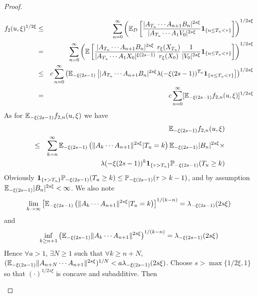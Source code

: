 \documentclass{article}
\begin{document}
\begin{proof}
\begin{enumerate}[(i)]
\begin{itemize}
\begin{eqnarray*}
        f_2(u, \xi)^{1/2\xi} &\leq& \sum_{n=0}^\infty \left(\mathbb{E}_D \left[
            \frac{
              |A_{T_u} \cdots A_{n+1} B_n |^{2s\xi}
            }{
              |A_{T_u} \cdots A_1 V_0|^{2s\xi}
            } \mathbf{1}_{\{n \leq T_u < \tau\}}
          \right]\right)^{1/2s\xi} \\
        &=& \sum_{n=0}^\infty \left(\mathbb{E} \left[
            \frac{
              |A_{T_u} \cdots A_{n+1} B_n |^{2s\xi}
            }{
              |A_{T_u} \cdots A_1 X_0|^{\xi(2s - 1)}
            }
            \frac{
              r_{\xi}(X_{T_u})
            }{
              r_{\xi}(X_{0})
            }
            {1 \over |V_0|^{2s\xi}}\mathbf{1}_{\{n \leq T_u < \tau\}}
          \right]\right)^{1/2s\xi} \\
        &\leq& c \sum_{n=0}^\infty
        \left(\mathbb{E}_{-\xi(2s - 1)} \left[
            |A_{T_u} \cdots A_{n+1} B_n |^{2s\xi}
            \lambda(-\xi(2s - 1))^{T_u}
            \mathbf{1}_{\{n \leq T_u < \tau\}}
          \right]\right)^{1/2s\xi} \\
        &=& c \sum_{n=0}^\infty [\mathbb{E}_{-\xi(2s - 1)}
        f_{2,n}(u,\xi)]^{1/2s\xi}
      \end{eqnarray*}
      As for $\mathbb{E}_{-\xi(2s - 1)} f_{2,n}(u,\xi)$ we have
      \begin{eqnarray*}
        && \mathbb{E}_{-\xi(2s - 1)} f_{2,n}(u,\xi) \\
        &\leq& \sum_{k=n}^\infty \mathbb{E}_{-\xi(2s - 1)}\left(
          \|A_k \cdots A_{n+1}\|^{2s\xi}|T_u = k \right)
        \mathbb{E}_{-\xi(2s - 1)} |B_n|^{2s\xi} \times \\
        && \lambda(-\xi(2s - 1))^{k} \mathbf{1}_{\{\tau > T_u\}}
        \mathbb{P}_{-\xi(2s - 1)}(T_u \geq k)
      \end{eqnarray*}
      Obviously $\mathbf{1}_{\{\tau > T_u\}} \mathbb{P}_{-\xi(2s - 1)}(T_u \geq k) \leq
      \mathbb{P}_{-\xi(2s - 1)}(\tau > k-1)$, and by assumption $\mathbb{E}_{-\xi(2s - 1)}
      |B_n|^{2s\xi} < \infty$. We also note
      \[
      \lim_{k \to \infty}
      \left[ \mathbb{E}_{-\xi(2s - 1)}\left(
          \|A_k \cdots A_{n+1}\|^{2s\xi}|T_u = k
        \right) \right]^{1/(k-n)} = \lambda_{-\xi(2s - 1)}(2s\xi)
      \]
      and
      \[
      \inf_{k \geq n+1}
      \left(
        \mathbb{E}_{-\xi(2s - 1)}\|A_k \cdots A_{n+1}\|^{2s\xi}
      \right)^{1/(k - n)} = \lambda_{-\xi(2s - 1)}(2s\xi)
      \]
      Hence $\forall a > 1$, $\exists N \geq 1$ such that $\forall k
      \geq n + N$, $(\mathbb{E}_{-\xi(2s - 1)}\|A_{n+N} \cdots
      A_{n+1}\|^{2s\xi})^{1/N} < a \lambda_{-\xi(2s -
        1)}(2s\xi)$. Choose $s > \max\{1/2\xi, 1\}$ so that
      $(\cdot)^{1/2s\xi}$ is concave and subadditive. Then

\end{itemize}
\end{enumerate}
\end{proof}
\end{document}
